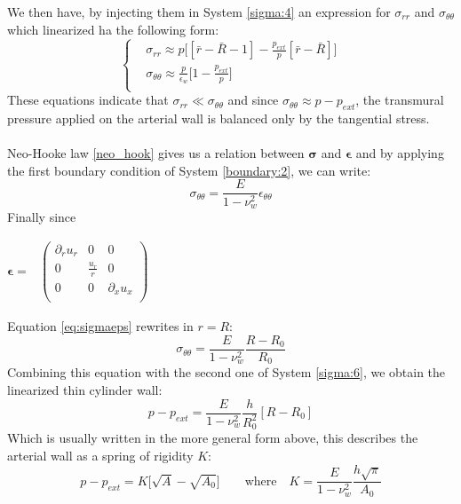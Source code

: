 \documentclass[12pt,a4paper]{article}
\numberwithin{equation}{section}
\begin{document}
We then have, by injecting them in System \ref{sigma:4} an expression for $\sigma_{rr}$ and $\sigma_{\theta\theta}$ which linearized ha the following form:
\begin{equation} \label{sigma:6}
  \left\{
      \begin{aligned}
       & \sigma_{rr} \approx p\Big[[\bar{r}-\bar{R}-1]-\frac{p_{ext}}{p}[\bar{r}-\bar{R}]\Big] \\
       & \sigma_{\theta\theta} \approx \frac{p}{\epsilon_w}\Big[1-\frac{p_{ext}}{p}\Big] \\
      \end{aligned}
    \right.
\end{equation}
These equations indicate that $\sigma_{rr} \ll \sigma_{\theta\theta}$ and since $\sigma_{\theta\theta} \approx p -p_{ext}$, the transmural pressure applied on the arterial wall is balanced only by the tangential stress.\\
\\
Neo-Hooke law \ref{neo_hook} gives us a relation between $\boldsymbol{\sigma}$ and $\boldsymbol{\epsilon}$ and by applying the first boundary condition of System \ref{boundary:2}, we can write:
\begin{equation} \label{eq:sigmaeps}
\sigma_{\theta\theta} = \frac{E}{1-\nu_w^2}\epsilon_{\theta\theta}
\end{equation}
Finally since 
\begin{center}
$\boldsymbol{\epsilon} = $
$\begin{matrix}
\begin{pmatrix}
\partial_ru_r & 0 & 0 \\
0 & \frac{u_r}{r} & 0 \\
0 & 0 & \partial_xu_x \\
\end{pmatrix}
\end{matrix}$
\end{center}
Equation \ref{eq:sigmaeps} rewrites in $r = R$:
\begin{equation}
\sigma_{\theta\theta} = \frac{E}{1-\nu^2_w}\frac{R-R_0}{R_0}
\end{equation}
Combining this equation with the second one of System \ref{sigma:6}, we obtain the linearized thin cylinder wall:
\begin{equation} 
p-p_{ext} = \frac{E}{1-\nu_w^2}\frac{h}{R_0^2}[R-R_0]
\end{equation}
Which is usually written in the more general form above, this describes the arterial wall as a spring of rigidity $K$:
\begin{equation}
p-p_{ext} = K\Big[\sqrt{A}-\sqrt{A_0}\Big] \qquad\textrm{where}\quad K = \frac{E}{1-\nu_w^2}\frac{h\sqrt{\pi}}{A_0}
\end{equation}
\end{document}
